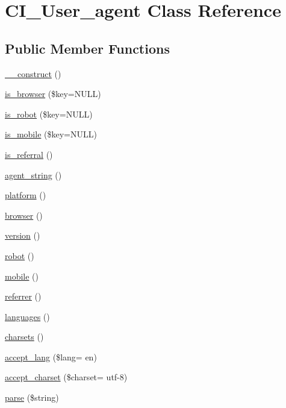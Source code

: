 \hypertarget{class_c_i___user__agent}{}\section{C\+I\+\_\+\+User\+\_\+agent Class Reference}
\label{class_c_i___user__agent}
\subsection*{Public Member Functions}
\begin{DoxyCompactItemize}
\item 
\hyperlink{class_c_i___user__agent_a095c5d389db211932136b53f25f39685}{\+\_\+\+\_\+construct} ()
\item 
\hyperlink{class_c_i___user__agent_a3a0c84a9f4a781e53c7529af8a5075ae}{is\+\_\+browser} (\$key=N\+U\+L\+L)
\item 
\hyperlink{class_c_i___user__agent_aaf9eed8184635473476a24f6a850815c}{is\+\_\+robot} (\$key=N\+U\+L\+L)
\item 
\hyperlink{class_c_i___user__agent_ab0ec0b7f6a5eeaf00e35743c25e68dfe}{is\+\_\+mobile} (\$key=N\+U\+L\+L)
\item 
\hyperlink{class_c_i___user__agent_ab2ec679c069f45c4265dade1e1097f17}{is\+\_\+referral} ()
\item 
\hyperlink{class_c_i___user__agent_a2a75d1ec3cf3f59cdcae64f6afbc8a1b}{agent\+\_\+string} ()
\item 
\hyperlink{class_c_i___user__agent_ad69bddb2ba31b27415484b3da4213ba8}{platform} ()
\item 
\hyperlink{class_c_i___user__agent_a7dbfb19bfe0682921dcfad5de8dc987c}{browser} ()
\item 
\hyperlink{class_c_i___user__agent_a6080dae0886626b9a4cedb29240708b1}{version} ()
\item 
\hyperlink{class_c_i___user__agent_a4d6a9230d82ec6fc2fdd6bc57f4da5e5}{robot} ()
\item 
\hyperlink{class_c_i___user__agent_a8e13f70e084cbb413d7b68805f3b09dd}{mobile} ()
\item 
\hyperlink{class_c_i___user__agent_a3a7bdecfe4516d7ce790734ae1449d29}{referrer} ()
\item 
\hyperlink{class_c_i___user__agent_adda8fc15b6fe0efc05a50d2645189c77}{languages} ()
\item 
\hyperlink{class_c_i___user__agent_a1c3819a3fa2777b0b0f2c8ab5d97d833}{charsets} ()
\item 
\hyperlink{class_c_i___user__agent_af6634c0f7064ab2530a59986e224161a}{accept\+\_\+lang} (\$lang= \textquotesingle{}en\textquotesingle{})
\item 
\hyperlink{class_c_i___user__agent_a42ef25d6a086c15f1d0b42409c9e157f}{accept\+\_\+charset} (\$charset= \textquotesingle{}utf-\/8\textquotesingle{})
\item 
\hyperlink{class_c_i___user__agent_a8652be52c4455b8ce1a8e79fdb083703}{parse} (\$string)
\end{DoxyCompactItemize}
